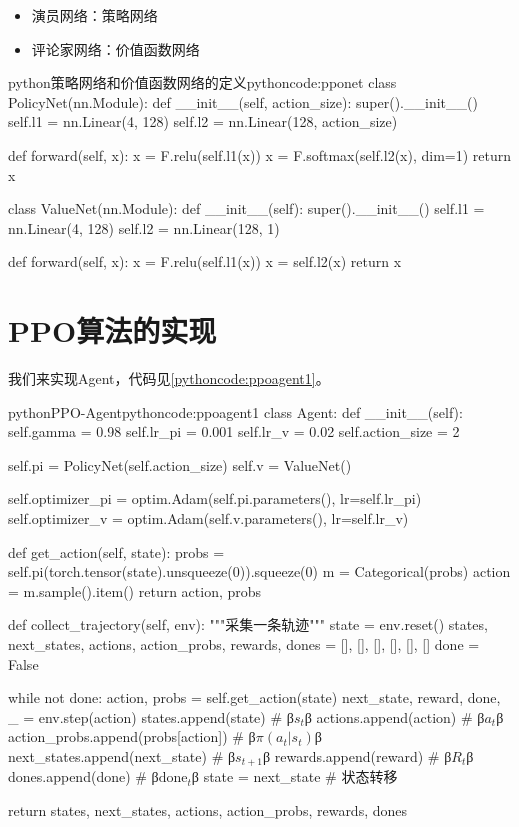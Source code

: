 \documentclass[lang=cn,newtx,10pt,scheme=chinese]{elegantbook}
\begin{document}
\begin{marker}
\begin{itemize}
    \item 演员网络：策略网络
    \item 评论家网络：价值函数网络
\end{itemize}
\end{marker}

\begin{codebox}{python}{策略网络和价值函数网络的定义}{pythoncode:pponet}
class PolicyNet(nn.Module):
    def __init__(self, action_size):
        super().__init__()
        self.l1 = nn.Linear(4, 128)
        self.l2 = nn.Linear(128, action_size)

    def forward(self, x):
        x = F.relu(self.l1(x))
        x = F.softmax(self.l2(x), dim=1)
        return x

class ValueNet(nn.Module):
    def __init__(self):
        super().__init__()
        self.l1 = nn.Linear(4, 128)
        self.l2 = nn.Linear(128, 1)

    def forward(self, x):
        x = F.relu(self.l1(x))
        x = self.l2(x)
        return x
\end{codebox}

\section{PPO算法的实现}

我们来实现Agent，代码见\ref{pythoncode:ppoagent1}。

\begin{codebox}{python}{PPO-Agent}{pythoncode:ppoagent1}
class Agent:
    def __init__(self):
        self.gamma = 0.98
        self.lr_pi = 0.001
        self.lr_v = 0.02
        self.action_size = 2

        self.pi = PolicyNet(self.action_size)
        self.v = ValueNet()

        self.optimizer_pi = optim.Adam(self.pi.parameters(), lr=self.lr_pi)
        self.optimizer_v = optim.Adam(self.v.parameters(), lr=self.lr_v)

    def get_action(self, state):
        probs = self.pi(torch.tensor(state).unsqueeze(0)).squeeze(0)
        m = Categorical(probs)
        action = m.sample().item()
        return action, probs

    def collect_trajectory(self, env):
        """采集一条轨迹"""
        state = env.reset()
        states, next_states, actions, action_probs, rewards, dones = [], [], [], [], [], []
        done = False

        while not done:
            action, probs = self.get_action(state)
            next_state, reward, done, _ = env.step(action)
            states.append(state) # β$s_t$β
            actions.append(action) # β$a_t$β
            action_probs.append(probs[action]) # β$\pi(a_t|s_t)$β
            next_states.append(next_state) # β$s_{t+1}$β
            rewards.append(reward) # β$R_t$β
            dones.append(done) # β$\text{done}_t$β
            state = next_state # 状态转移

        return states, next_states, actions, action_probs, rewards, dones
\end{codebox}
\end{document}
